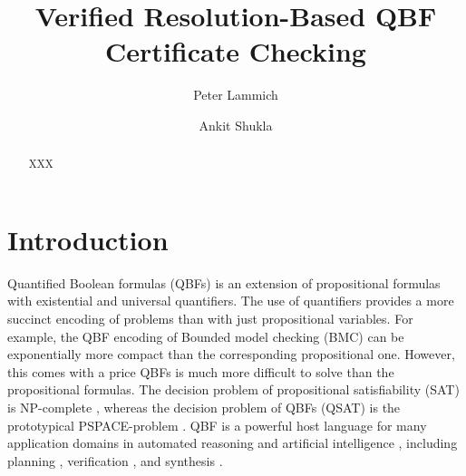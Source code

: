 \documentclass[runningheads]{llncs}
\newcommand{\0}{0}
\newcommand{\1}{1}
\begin{document}

%
\title{Verified Resolution-Based QBF Certificate Checking}


%
\author{Peter Lammich \and Ankit Shukla}

%
%
\maketitle              %
%
\begin{abstract} 
 XXX

\end{abstract}

\section{Introduction}
\label{sec:intro}
Quantified Boolean formulas (QBFs) is an extension of propositional formulas with existential and universal quantifiers. The use of quantifiers provides a more succinct encoding of problems than with just propositional variables. For example, the QBF encoding of Bounded model checking (BMC) \cite{DershowitzHK05} can be exponentially more compact than the corresponding propositional one. However, this comes with a price QBFs is much more difficult to solve than the propositional formulas. The decision problem of propositional satisfiability (SAT) is NP-complete \cite{Cook71}, whereas the decision problem of QBFs (QSAT) is the prototypical PSPACE-problem \cite{StockmeyerM73}. QBF is a powerful host language for many application domains in automated reasoning and artificial intelligence \cite{ShuklaBPS19}, including planning \cite{AnsoteguiGS05, EglyKLP17, Cashmore2012planning, Gasquet18}, verification \cite{MillerSB13}, and synthesis \cite{BloemKS14, BloemEKKL14, Gange2014synthesizing}. 
\end{document}
